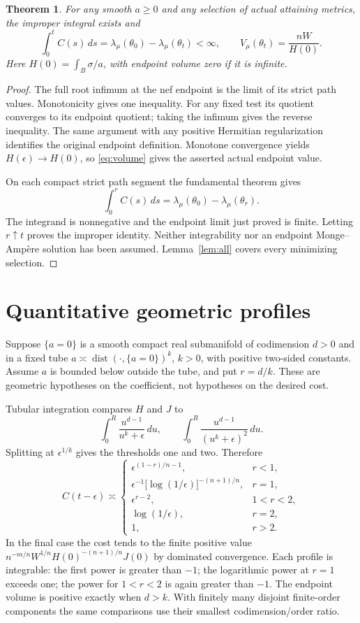 \documentclass[11pt]{article}
\newtheorem{theorem}{Theorem}
\theoremstyle{remark}\newtheorem{remark}[theorem]{Remark}
\begin{document}
\begin{theorem}\label{th:endpoint}
For any smooth $a\geq0$ and any selection of actual attaining metrics,
the improper integral exists and
\[
 \int_0^t C(s)\,ds
 =\lambda_\mu(\theta_0)-\lambda_\mu(\theta_t)<\infty,
 \qquad V_\mu(\theta_t)=\frac{nW}{H(0)}.
\]
Here $H(0)=\int_B\sigma/a$, with endpoint volume zero if it is infinite.
\end{theorem}
\begin{proof}
The full root infimum at the nef endpoint is the limit of its strict
path values. Monotonicity gives one inequality. For any fixed test its
quotient converges to its endpoint quotient; taking the infimum gives
the reverse inequality. The same argument with any positive Hermitian
regularization identifies the original endpoint definition.
Monotone convergence yields $H(\epsilon)\to H(0)$, so
\eqref{eq:volume} gives the asserted actual endpoint value.

On each compact strict path segment the fundamental theorem gives
\[
 \int_0^r C(s)\,ds=\lambda_\mu(\theta_0)-\lambda_\mu(\theta_r).
\]
The integrand is nonnegative and the endpoint limit just proved is
finite. Letting $r\uparrow t$ proves the improper identity.
Neither integrability nor an endpoint Monge--Amp\`ere solution has been
assumed. Lemma~\ref{lem:all} covers every minimizing selection.
\end{proof}

\section{Quantitative geometric profiles}
Suppose $\{a=0\}$ is a smooth compact real submanifold of codimension
$d>0$ and in a fixed tube
$a\asymp\operatorname{dist}(\cdot,\{a=0\})^k$, $k>0$,
with positive two-sided constants. Assume $a$ is bounded below outside
the tube, and put $r=d/k$. These are geometric hypotheses on the
coefficient, not hypotheses on the desired cost.

Tubular integration compares $H$ and $J$ to
\[
 \int_0^R\frac{u^{d-1}}{u^k+\epsilon}\,du,
 \qquad \int_0^R\frac{u^{d-1}}{(u^k+\epsilon)^2}\,du.
\]
Splitting at $\epsilon^{1/k}$ gives the thresholds one and two. Therefore
\begin{equation}\label{eq:profiles}
 C(t-\epsilon)\asymp
 \begin{cases}
 \epsilon^{(1-r)/n-1},&r<1,\\
 \epsilon^{-1}\bigl[\log(1/\epsilon)\bigr]^{-(n+1)/n},&r=1,\\
 \epsilon^{r-2},&1<r<2,\\
 \log(1/\epsilon),&r=2,\\
 1,&r>2.
 \end{cases}
\end{equation}
In the final case the cost tends to the finite positive value
$n^{-m/n}W^{1/n}H(0)^{-(n+1)/n}J(0)$ by dominated convergence.
Each profile is integrable: the first power is greater than $-1$;
the logarithmic power at $r=1$ exceeds one; the power for $1<r<2$
is again greater than $-1$. The endpoint volume is positive exactly
when $d>k$. With finitely many disjoint finite-order components the
same comparisons use their smallest codimension/order ratio.
\end{document}
